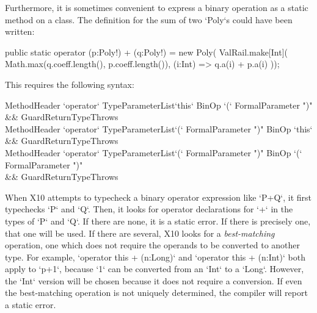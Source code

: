 Furthermore, it is sometimes convenient to express a binary operation as a
static method on a class. 
The definition for the sum of two
\xcd`Poly`s could have been written:
\begin{xten}
  public static operator (p:Poly!) + (q:Poly!) =  new Poly(
     ValRail.make[Int](
        Math.max(q.coeff.length(), p.coeff.length()),
        (i:Int) => q.a(i) + p.a(i)
     ));
\end{xten}
%
% 
%     


This requires the following syntax:\\ 
\begin{grammar}
MethodHeader \:
  \xcd`operator` TypeParameterList\opt \xcd`this` BinOp \xcd`(`  FormalParameter \xcd")" \\
  && Guard\opt ReturnType\opt  Throws\opt \\
MethodHeader \:
  \xcd`operator` TypeParameterList\opt \xcd`(`  FormalParameter \xcd")" BinOp \xcd`this`  \\
  && Guard\opt ReturnType\opt  Throws\opt \\
MethodHeader \:
  \xcd`operator` TypeParameterList\opt \xcd`(`  FormalParameter \xcd")" BinOp  \xcd`(`  FormalParameter \xcd")"  \\
  && Guard\opt ReturnType\opt  Throws\opt \\
\end{grammar}

When X10 attempts to typecheck a binary operator expression like \xcd`P+Q`, it
first typechecks \xcd`P` and \xcd`Q`. Then, it looks for operator declarations
for \xcd`+` in the types of \xcd`P` and \xcd`Q`. If there are none, it is a
static error. If there is precisely one, that one will be used. If there are
several, X10 looks for a {\em best-matching} operation, \viz{} one which does
not require the operands to be converted to another type. For example,
\xcd`operator this + (n:Long)` and \xcd`operator this + (n:Int)` both apply to
\xcd`p+1`, because \xcd`1` can be converted from an \xcd`Int` to a \xcd`Long`.
However, the \xcd`Int` version will be chosen because it does not require a
conversion. If even the best-matching operation is not uniquely determined,
the compiler will report a static error.

